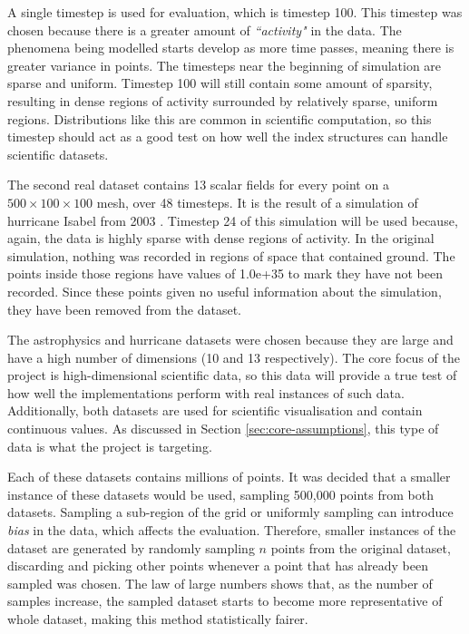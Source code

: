 A single timestep is used for evaluation, which is timestep 100. This timestep was chosen because there is a greater amount of \textit{``activity"} in the data. The phenomena being modelled starts develop as more time passes, meaning there is greater variance in points. The timesteps near the beginning of simulation are sparse and uniform. Timestep 100 will still contain some amount of sparsity, resulting in dense regions of activity surrounded by relatively sparse, uniform regions. Distributions like this are common in scientific computation, so this timestep should act as a good test on how well the index structures can handle scientific datasets.

The second real dataset contains 13 scalar fields for every point on a $500 \times 100 \times 100$ mesh, over 48 timesteps. It is the result of a simulation of hurricane Isabel from 2003 \cite{hurricane-isabel-dataset}. Timestep 24 of this simulation will be used because, again, the data is highly sparse with dense regions of activity. In the original simulation, nothing was recorded in regions of space that contained ground. The points inside those regions have values of 1.0e+35 to mark they have not been recorded. Since these points given no useful information about the simulation, they have been removed from the dataset.

The astrophysics and hurricane datasets were chosen because they are large and have a high number of dimensions (10 and 13 respectively). The core focus of the project is high-dimensional scientific data, so this data will provide a true test of how well the implementations perform with real instances of such data. Additionally, both datasets are used for scientific visualisation and contain continuous values. As discussed in Section \ref{sec:core-assumptions}, this type of data is what the project is targeting.

Each of these datasets contains millions of points. It was decided that a smaller instance of these datasets would be used, sampling 500,000 points from both datasets. Sampling a sub-region of the grid or uniformly sampling can introduce \textit{bias} in the data, which affects the evaluation. Therefore, smaller instances of the dataset are generated by randomly sampling $n$ points from the original dataset, discarding and picking other points whenever a point that has already been sampled was chosen. The law of large numbers \cite{large-sample-theory} shows that, as the number of samples increase, the sampled dataset starts to become more representative of whole dataset, making this method statistically fairer.

